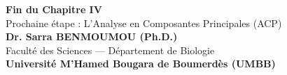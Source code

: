 \documentclass[aspectratio=169,10pt]{beamer}
\begin{document}
\begin{frame}[plain]
  \begin{center}
    \vspace{1.8cm}
    {\Huge\color{BioNavy}\textbf{Fin du Chapitre IV}}\\[0.8cm]
    {\large Prochaine étape : L'Analyse en Composantes Principales (ACP)}\\[1.2cm]
    \textbf{Dr. Sarra BENMOUMOU (Ph.D.)}\\
    \small Faculté des Sciences --- Département de Biologie\\
    \textbf{Université M'Hamed Bougara de Boumerdès (UMBB)}
  \end{center}
\end{frame}
\end{document}
